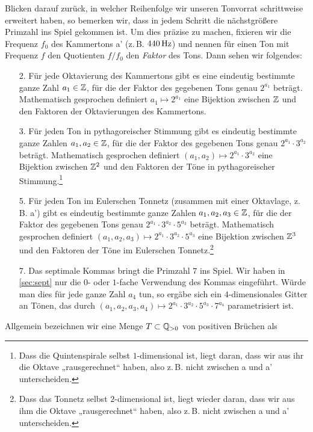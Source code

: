 Blicken darauf zurück, in welcher Reihenfolge wir unseren Tonvorrat schrittweise
erweitert haben, so bemerken wir, dass in jedem Schritt die nächstgrößere
Primzahl ins Spiel gekommen ist. Um dies präzise zu machen, fixieren wir die
Frequenz $f_0$ des Kammertons a’ (z.\,B. $440\,\text{Hz}$) und nennen für einen Ton mit
Frequenz $f$ den Quotienten $f/f_0$ den \emph{Faktor} des Tons. Dann sehen wir
folgendes:
\begin{enumerate}
\item[2.] Für jede Oktavierung des Kammertons gibt es eine eindeutig bestimmte
  ganze Zahl $a_1\in\mathbb{Z}$, für die der Faktor des gegebenen Tons genau $2^{a_1}$
  beträgt. Mathematisch gesprochen definiert $a_1\mapsto 2^{a_1}$ eine Bijektion
  zwischen $\mathbb{Z}$ und den Faktoren der Oktavierungen des Kammertons.
\item[3.] Für jeden Ton in pythagoreischer Stimmung gibt es eindeutig bestimmte
  ganze Zahlen $a_1,a_2\in\mathbb{Z}$, für die der Faktor des gegebenen Tons genau
  $2^{a_1}\cdot 3^{a_2}$ beträgt. Mathematisch gesprochen definiert
  $(a_1,a_2)\mapsto 2^{a_1}\cdot 3^{a_2}$ eine Bijektion zwischen $\mathbb{Z}^2$ und den
  Faktoren der Töne in pythagoreischer Stimmung.\footnote{Dass die
    Quintenspirale selbst $1$-dimensional ist, liegt daran, dass wir aus ihr die
    Oktave „rausgerechnet“ haben, also z.\,B. nicht zwischen \flat a und \flat
    a’ unterscheiden.}
\item[5.] Für jeden Ton im Eulerschen Tonnetz (zusammen mit einer Oktavlage,
  z.\,B. \flatp a’) gibt es eindeutig bestimmte ganze Zahlen $a_1,a_2,a_3\in\mathbb{Z}$,
  für die der Faktor des gegebenen Tons genau
  $2^{a_1}\cdot 3^{a_2}\cdot 5^{a_3}$ beträgt.  Mathematisch gesprochen
  definiert $(a_1,a_2,a_3)\mapsto 2^{a_1}\cdot 3^{a_2}\cdot 5^{a_3}$ eine
  Bijektion zwischen $\mathbb{Z}^3$ und den Faktoren der Töne im Eulerschen
  Tonnetz.\footnote{Dass das Tonnetz selbst $2$-dimensional ist, liegt wieder
    daran, dass wir aus ihm die Oktave „rausgerechnet“ haben, also z.\,B. nicht
    zwischen \flatp a und \flatp a’ unterscheiden.}
\item[7.] Das septimale Kommas bringt die Primzahl $7$ ins Spiel. Wir haben in
  \cref{sec:sept} nur die $0$- oder $1$-fache Verwendung des Kommas
  eingeführt. Würde man dies für jede ganze Zahl $a_4$ tun, so ergäbe sich ein
  $4$-dimensionales Gitter an Tönen, das durch
  $(a_1,a_2,a_3,a_4)\mapsto 2^{a_1}\cdot 3^{a_2}\cdot 5^{a_3}\cdot 7^{a_4}$
  parametrisiert ist.
\end{enumerate}
Allgemein bezeichnen wir eine Menge $T\subset \mathbb{Q}_{>0}$ von positiven Brüchen als
